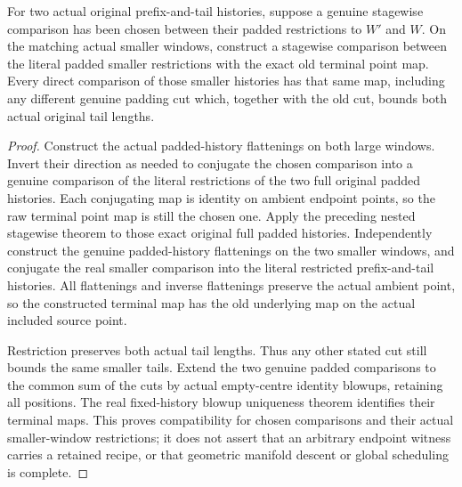 \begin{theorem}
\label{hir:sharp-actual-nested-padded-comparison}
\leanok
For two actual original prefix-and-tail histories, suppose a genuine
stagewise comparison has been chosen between their padded restrictions to
$W'$ and $W$. On the matching actual smaller windows, construct a stagewise
comparison between the literal padded smaller restrictions with the exact
old terminal point map. Every direct comparison of those smaller histories
has that same map, including any different genuine padding cut which,
together with the old cut, bounds both actual original tail lengths.
\end{theorem}
\begin{proof}
Construct the actual padded-history flattenings on both large windows.
Invert their direction as needed to conjugate the chosen comparison into
a genuine comparison of the literal restrictions of the two full original
padded histories. Each conjugating map is identity on ambient endpoint
points, so the raw terminal point map is still the chosen one.
Apply the preceding nested stagewise theorem to those exact original full
padded histories. Independently construct the genuine padded-history
flattenings on the two smaller windows, and conjugate the real smaller
comparison into the literal restricted prefix-and-tail histories. All
flattenings and inverse flattenings preserve the actual ambient point, so
the constructed terminal map has the old underlying map on the actual
included source point.

Restriction preserves both actual tail lengths. Thus any other stated cut
still bounds the same smaller tails. Extend the two genuine padded
comparisons to the common sum of the cuts by actual empty-centre identity
blowups, retaining all positions. The real fixed-history blowup uniqueness
theorem identifies their terminal maps. This proves compatibility for
chosen comparisons and their actual smaller-window restrictions; it does
not assert that an arbitrary endpoint witness carries a retained recipe,
or that geometric manifold descent or global scheduling is complete.
\end{proof}
